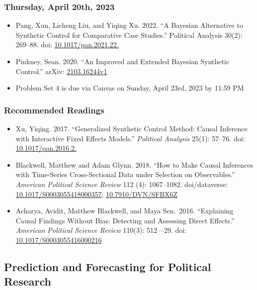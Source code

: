 \documentclass[12pt,]{article}
\begin{document}
\hypertarget{thursday-april-20th-2023}{%
\subsubsection{Thursday, April 20th,
2023}\label{thursday-april-20th-2023}}

\begin{itemize}
\item
  Pang, Xun, Licheng Liu, and Yiqing Xu. 2022. ``A Bayesian Alternative
  to Synthetic Control for Comparative Case Studies.'' Political
  Analysis 30(2): 269--88. doi:
  \href{https://doi.org/10.1017/pan.2021.22}{10.1017/pan.2021.22.}
\item
  Pinkney, Sean. 2020. ``An Improved and Extended Bayesian Synthetic
  Control.'' arXiv:
  \href{https://arxiv.org/abs/2103.16244}{2103.16244v1}
\item
  Problem Set 4 is due via Canvas on Sunday, April 23rd, 2023 by 11:59
  PM
\end{itemize}

\hypertarget{recommended-readings-10}{%
\subsubsection{Recommended Readings}\label{recommended-readings-10}}

\begin{itemize}
\item
  Xu, Yiqing. 2017. ``Generalized Synthetic Control Method: Causal
  Inference with Interactive Fixed Effects Models.'' \emph{Political
  Analysis} 25(1): 57--76. doi:
  \href{https://doi.org/10.1017/pan.2016.2}{10.1017/pan.2016.2.}
\item
  Blackwell, Matthew and Adam Glynn. 2018. ``How to Make Causal
  Inferences with Time-Series Cross-Sectional Data under Selection on
  Observables.'' \emph{American Political Science Review} 112 (4):
  1067--1082. doi/dataverse:
  \href{https://doi.org/10.1017/S0003055418000357}{10.1017/S0003055418000357};
  \href{https://doi.org/10.7910/DVN/SFBX6Z}{10.7910/DVN/SFBX6Z}
\item
  Acharya, Avidit, Matthew Blackwell, and Maya Sen.~2016. ``Explaining
  Causal Findings Without Bias: Detecting and Assessing Direct
  Effects.'' \emph{American Political Science Review} 110(3): 512---29.
  doi:
  \href{https://doi.org/10.1017/S0003055416000216}{10.1017/S0003055416000216}
\end{itemize}

\hypertarget{prediction-and-forecasting-for-political-research}{%
\subsection{Prediction and Forecasting for Political
Research}\label{prediction-and-forecasting-for-political-research}}
\end{document}
